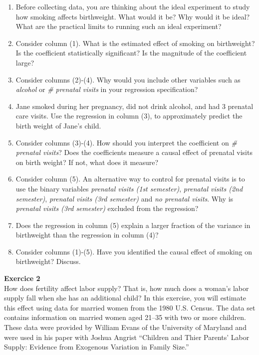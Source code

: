\documentclass{article}
\begin{document}
\vspace{.5cm}

\begin{enumerate}[label=\alph*)]
\item Before collecting data, you are thinking about the ideal experiment to study how smoking affects birthweight. What would it be? Why would it be ideal? What are the practical limits to running such an ideal experiment?
\item Consider column (1). What is the estimated effect of smoking on birthweight? Is the coefficient statistically significant? Is the magnitude of the coefficient large?
\item Consider columns (2)-(4). Why would you include other variables such as \textit{alcohol} or \textit{\# prenatal visits} in your regression specification? 
\item Jane smoked during her pregnancy, did not drink alcohol, and had 3 prenatal care visits. Use the regression in column (3), to approximately predict the birth weight of Jane’s child. 
\item  Consider columns (3)-(4). How should you interpret the coefficient on \textit{\# prenatal visits}? Does the coefficients measure a causal effect of prenatal visits on birth weight? If not, what does it measure? 
\item Consider column (5). An alternative way to control for prenatal visits is to use the binary variables \textit{prenatal visits (1st semester)},  \textit{prenatal visits (2nd semester)},  \textit{prenatal visits (3rd semester)} and \textit{no prenatal visits}. Why is \textit{prenatal visits (3rd semester)} excluded from the regression?
\item  Does the regression in column (5) explain a larger fraction of the variance in birthweight than the regression in column (4)?
\item Consider columns (1)-(5). Have you identified the causal effect of smoking on birthweight? Discuss.
\end{enumerate}

\textbf{Exercice 2} \\[1em]
How does fertility affect labor supply? That is, how much does a woman’s labor supply fall when she has an additional child? In this exercise, you will estimate this effect using data for married women from the 1980 U.S. Census. The data set contains information on married women aged 21–35 with two or more children. These data were provided by William Evans of the University of Maryland and were used in his paper with Joshua Angrist ``Children and Thier Parents’ Labor Supply: Evidence from Exogenous Variation in Family Size.'' \\[1em]
\end{document}
